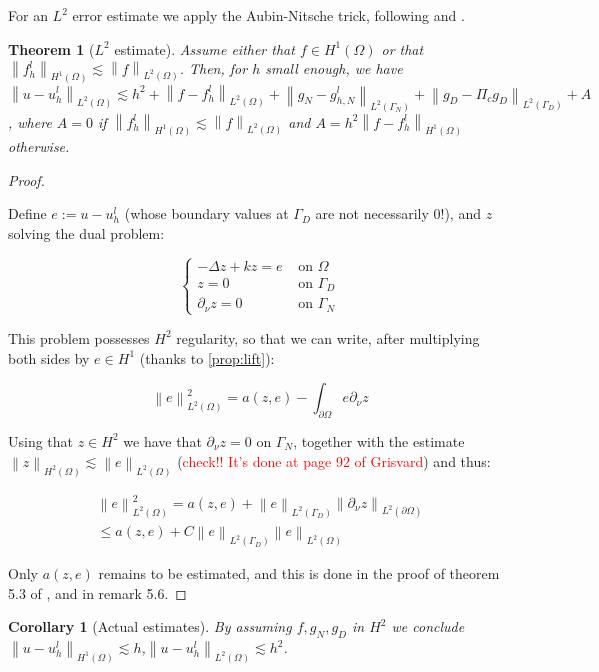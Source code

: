\documentclass[english,a4paper,9pt,oneside]{scrbook}	%
\theoremstyle{break}
\newtheorem{thm}[equation]{Theorem}
\newtheorem{cor}[equation]{Corollary}
\newenvironment{mproof}[1][\proofname]{%
  \begin{proof}[#1]$ $\par\nobreak\ignorespaces
}{%
  \end{proof}
}
\renewcommand*{\proofname}{Proof}
\theoremstyle{remark}
\newcommand{\norm}[1]{\left\lVert#1\right\rVert}
\begin{document}
\begin{appendices}
For an $L^2$ error estimate we apply the Aubin-Nitsche trick, following \cite{fairweather} and \cite{edelmann}.

\begin{thm}[$L^2$ estimate]
\label{thm:L2_est_ell}
Assume either that $f \in H^1(\Omega)$ or that $\norm{f^l_h}_{H^1(\Omega)}\lesssim \norm{f}_{L^2(\Omega)}$. Then, for $h$ small enough, we have $\norm{u-u_h^l}_{L^2(\Omega)}\lesssim h^2 + \norm{f-f_h^l}_{L^2(\Omega)}+ \norm{g_N-g_{h,N}^l}_{L^2(\Gamma_N)} + \norm{g_D - \Pi_c g_D}_{L^2(\Gamma_D)} + A$, where $A = 0$ if  $\norm{f^l_h}_{H^1(\Omega)}\lesssim \norm{f}_{L^2(\Omega)}$ and $A = h^2\norm{f-f_h^l}_{H^1(\Omega)}$ otherwise.
\end{thm}

\begin{mproof}

Define $e:=u-u_h^l$ (whose boundary values at $\Gamma_D$ are not necessarily $0$!), and $z$ solving the dual problem:

$$
\left\{\begin{matrix}
-\Delta z + k z = e & \text{ on } \Omega \\ 
z = 0 & \text{ on } \Gamma_D \\ 
\partial_\nu z = 0 & \text{ on } \Gamma_N 
\end{matrix}\right.
$$

This problem possesses $H^2$ regularity, so that we can write, after multiplying both sides by $e \in H^1$ (thanks to \cref{prop:lift}):

$$\norm{e}^2_{L^2(\Omega)} = a(z,e) - \int_{\partial \Omega} e \partial_\nu z  $$

Using that $z \in H^2$ we have that $\partial_\nu z=0$ on $\Gamma_N$, together with the estimate $\norm{z}_{H^2(\Omega)}\lesssim \norm{e}_{L^2(\Omega)}$ (\textcolor{red}{check!! It's done at page 92 of Grisvard}) and thus:

\begin{align*}
\norm{e}^2_{L^2(\Omega)} = a(z,e) +\norm{e}_{L^2(\Gamma_D)}\norm{ \partial_\nu z}_{L^2(\partial \Omega)} \\
\leq a(z,e) + C \norm{e}_{L^2(\Gamma_D)}\norm{e}_{L^2( \Omega)}
\end{align*}

Only $ a(z,e)$ remains to be estimated, and this is done in the proof of theorem 5.3 of \cite{edelmann}, and in remark 5.6.

\end{mproof}

\begin{cor}[Actual estimates]
By assuming $f,g_N, g_D$ in $H^2$ we conclude $\norm{u-u_h^l}_{H^1(\Omega)} \lesssim h$,$ \norm{u-u_h^l}_{L^2(\Omega)} \lesssim h^2$.
\end{cor}


\end{appendices}
\end{document}
